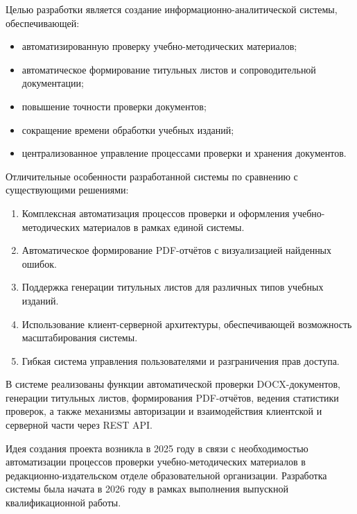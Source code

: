 Целью разработки является создание информационно-аналитической системы, обеспечивающей:
\begin{itemize}
	\item автоматизированную проверку учебно-методических материалов;
	
	\item автоматическое формирование титульных листов и сопроводительной документации;
	
	\item повышение точности проверки документов;
	
	\item сокращение времени обработки учебных изданий;
	
	\item централизованное управление процессами проверки и хранения документов.
\end{itemize}

Отличительные особенности разработанной системы по сравнению с существующими решениями:
\begin{enumerate}
	\item Комплексная автоматизация процессов проверки и оформления учебно-методических материалов в рамках единой системы.
	
	\item Автоматическое формирование PDF-отчётов с визуализацией найденных ошибок.
	
	\item Поддержка генерации титульных листов для различных типов учебных изданий.
	
	\item Использование клиент-серверной архитектуры, обеспечивающей возможность масштабирования системы.
	
	\item Гибкая система управления пользователями и разграничения прав доступа.
\end{enumerate}

В системе реализованы функции автоматической проверки DOCX-документов, генерации титульных листов, формирования PDF-отчётов, ведения статистики проверок, а также механизмы авторизации и взаимодействия клиентской и серверной части через REST API.

Идея создания проекта возникла в 2025 году в связи с необходимостью автоматизации процессов проверки учебно-методических материалов в редакционно-издательском отделе образовательной организации. Разработка системы была начата в 2026 году в рамках выполнения выпускной квалификационной работы.

